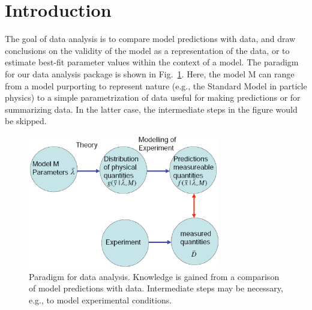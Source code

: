 \documentclass[11pt, a4paper]{article}
\begin{document}
\pagebreak 


\thispagestyle{empty} 

\tableofcontents

\pagebreak 


\section{Introduction}

The goal of data analysis is to compare model predictions with data,
and draw conclusions on the validity of the model as a representation
of the data, or to estimate best-fit parameter values within the
context of a model. The paradigm for our data analysis package is
shown in Fig.~\ref{fig:scheme}.  Here, the model M can range from a
model purporting to represent nature (e.g., the Standard Model in
particle physics) to a simple parametrization of data useful for
making predictions or for summarizing data.  In the latter case, the
intermediate steps in the figure would be skipped. \\ 

\begin{figure}[htbp] %
\centering
\includegraphics[width=0.75\textwidth]{scheme.eps} 
\caption{Paradigm for data analysis.  Knowledge is gained from a
comparison of model predictions with data.  Intermediate steps may be
necessary, e.g., to model experimental conditions.}
\label{fig:scheme}
\end{figure}
\end{document}
